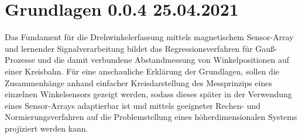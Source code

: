 %

\chapter{Grundlagen 0.0.4 25.04.2021}\label{ch:grundlagen}

Das Fundament für die Drehwinkelerfassung mittels magnetischem Sensor-Array und lernender Signalverarbeitung 
\cite{Schuethe2019}\cite{Schuethe2020}\cite{Schuethe2020a} bildet das Regressionsverfahren für Gauß-Prozesse 
\cite{Rasmussen2006} und die damit verbundene Abstandmessung von Winkelpositionen auf einer Kreisbahn.
Für eine anschauliche Erklärung der Grundlagen, sollen die Zusammenhänge anhand einfacher Kreisdarstellung des 
Messprinzips eines einzelnen Winkelsensors gezeigt werden, sodass dieses später in der Verwendung eines Sensor-Arrays 
adaptierbar ist und mittels geeigneter Rechen- und Normierungsverfahren auf die Problemstellung eines 
höherdimensionalen Systems projiziert werden kann.











